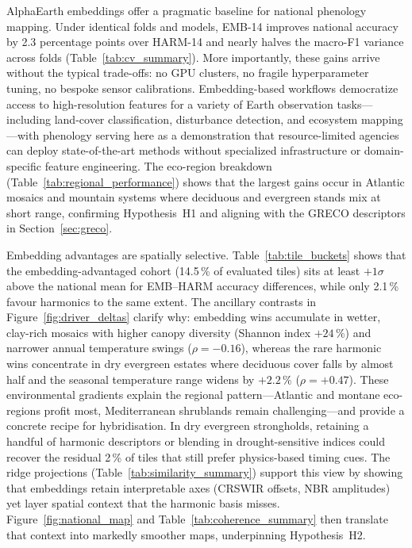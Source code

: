 \documentclass[utf8]{FrontiersinHarvard}
\begin{document}
AlphaEarth embeddings \citep{AlphaEarth2025} offer a pragmatic baseline for national phenology mapping. Under identical folds and models, EMB-14 improves national accuracy by 2.3 percentage points over HARM-14 and nearly halves the macro-F1 variance across folds (Table~\ref{tab:cv_summary}). More importantly, these gains arrive without the typical trade-offs: no GPU clusters, no fragile hyperparameter tuning, no bespoke sensor calibrations. Embedding-based workflows democratize access to high-resolution features for a variety of Earth observation tasks—including land-cover classification, disturbance detection, and ecosystem mapping—with phenology serving here as a demonstration that resource-limited agencies can deploy state-of-the-art methods without specialized infrastructure or domain-specific feature engineering. The eco-region breakdown (Table~\ref{tab:regional_performance}) shows that the largest gains occur in Atlantic mosaics and mountain systems where deciduous and evergreen stands mix at short range, confirming Hypothesis~H1 and aligning with the GRECO descriptors in Section~\ref{sec:greco}.

Embedding advantages are spatially selective. Table~\ref{tab:tile_buckets} shows that the embedding-advantaged cohort (14.5\,\% of evaluated tiles) sits at least \(+1\sigma\) above the national mean for EMB--HARM accuracy differences, while only 2.1\,\% favour harmonics to the same extent. The ancillary contrasts in Figure~\ref{fig:driver_deltas} clarify why: embedding wins accumulate in wetter, clay-rich mosaics with higher canopy diversity (Shannon index \(+24\,\%\)) and narrower annual temperature swings (\(\rho=-0.16\)), whereas the rare harmonic wins concentrate in dry evergreen estates where deciduous cover falls by almost half and the seasonal temperature range widens by \(+2.2\,\%\) (\(\rho=+0.47\)). These environmental gradients explain the regional pattern—Atlantic and montane eco-regions profit most, Mediterranean shrublands remain challenging—and provide a concrete recipe for hybridisation. In dry evergreen strongholds, retaining a handful of harmonic descriptors or blending in drought-sensitive indices could recover the residual 2\,\% of tiles that still prefer physics-based timing cues. The ridge projections (Table~\ref{tab:similarity_summary}) support this view by showing that embeddings retain interpretable axes (CRSWIR offsets, NBR amplitudes) yet layer spatial context that the harmonic basis misses. Figure~\ref{fig:national_map} and Table~\ref{tab:coherence_summary} then translate that context into markedly smoother maps, underpinning Hypothesis~H2.
\end{document}
